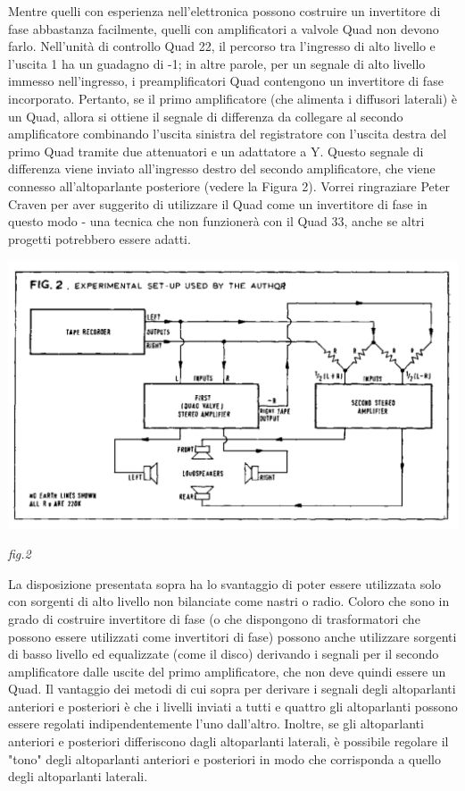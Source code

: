 \documentclass[11pt]{article}
\begin{document}
\begin{multicols*}{2}
Mentre quelli con esperienza nell'elettronica possono costruire un invertitore di fase abbastanza facilmente, quelli con amplificatori a valvole Quad non devono farlo. Nell'unità di controllo Quad 22, il percorso tra l'ingresso di alto livello e l’uscita 1 ha un guadagno di -1; in altre parole, per un segnale di alto livello immesso nell’ingresso, i preamplificatori Quad contengono un invertitore di fase incorporato. Pertanto, se il primo amplificatore (che alimenta i diffusori laterali) è un Quad, allora si ottiene il segnale di differenza da collegare al secondo amplificatore combinando l'uscita sinistra del registratore con l'uscita destra del primo Quad tramite due attenuatori e un adattatore a Y. Questo segnale di differenza viene inviato all'ingresso destro del secondo amplificatore, che viene connesso all'altoparlante posteriore (vedere la Figura 2). Vorrei ringraziare Peter Craven per aver suggerito di utilizzare il Quad come un invertitore di fase in questo modo - una tecnica che non funzionerà con il Quad 33, anche se altri progetti potrebbero essere adatti.


\begin{center}
\includegraphics[scale = 0.43]{images/fig_02.png}


{\scriptsize \emph{fig.2 }}
\end{center}

La disposizione presentata sopra ha lo svantaggio di poter essere utilizzata solo con sorgenti di alto livello non bilanciate come nastri o radio. Coloro che sono in grado di costruire invertitore di fase (o che dispongono di trasformatori che possono essere utilizzati come invertitori di fase) possono anche utilizzare sorgenti di basso livello ed equalizzate (come il disco) derivando i segnali per il secondo amplificatore dalle uscite del primo amplificatore, che non deve quindi essere un Quad. Il vantaggio dei metodi di cui sopra per derivare i segnali degli altoparlanti anteriori e posteriori è che i livelli inviati a tutti e quattro gli altoparlanti possono essere regolati indipendentemente l'uno dall'altro. Inoltre, se gli altoparlanti anteriori e posteriori differiscono dagli altoparlanti laterali, è possibile regolare il "tono" degli altoparlanti anteriori e posteriori in modo che corrisponda a quello degli altoparlanti laterali.


\end{multicols*}
\end{document}
